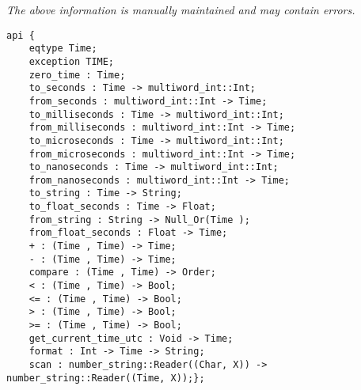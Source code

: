 \label{api:Time}

{\tiny \it The above information is manually maintained and may contain errors.}
\begin{verbatim}
api {
    eqtype Time;
    exception TIME;
    zero_time : Time;
    to_seconds : Time -> multiword_int::Int;
    from_seconds : multiword_int::Int -> Time;
    to_milliseconds : Time -> multiword_int::Int;
    from_milliseconds : multiword_int::Int -> Time;
    to_microseconds : Time -> multiword_int::Int;
    from_microseconds : multiword_int::Int -> Time;
    to_nanoseconds : Time -> multiword_int::Int;
    from_nanoseconds : multiword_int::Int -> Time;
    to_string : Time -> String;
    to_float_seconds : Time -> Float;
    from_string : String -> Null_Or(Time );
    from_float_seconds : Float -> Time;
    + : (Time , Time) -> Time;
    - : (Time , Time) -> Time;
    compare : (Time , Time) -> Order;
    < : (Time , Time) -> Bool;
    <= : (Time , Time) -> Bool;
    > : (Time , Time) -> Bool;
    >= : (Time , Time) -> Bool;
    get_current_time_utc : Void -> Time;
    format : Int -> Time -> String;
    scan : number_string::Reader((Char, X)) -> number_string::Reader((Time, X));};
\end{verbatim}
\index[fun]{>=}
\index[fun]{>}
\index[fun]{<=}
\index[fun]{<}
\index[fun]{-}
\index[fun]{+}
